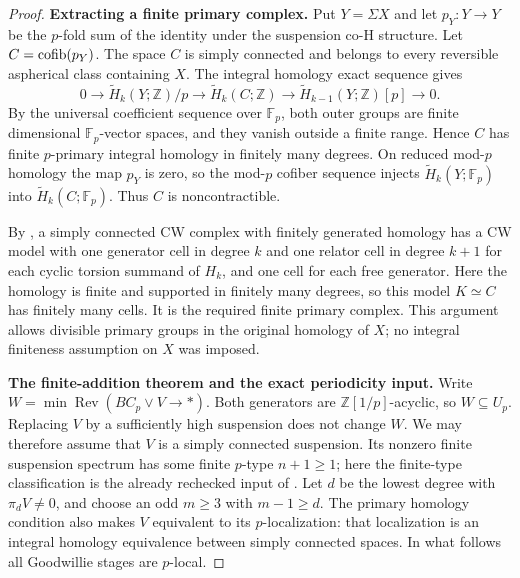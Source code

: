 \begin{proof}
\par\medskip\noindent\textbf{Extracting a finite primary complex.}\quad
Put $Y=\Sigma X$ and let $p_Y:Y\to Y$ be the $p$-fold sum
of the identity under the suspension co-H structure.  Let
$C=\operatorname{cofib}(p_Y)$.  The space $C$ is simply connected and belongs
to every reversible aspherical class containing $X$.  The integral
homology exact sequence gives
\[
 0\longrightarrow \widetilde H_k(Y;\mathbb Z)/p
 \longrightarrow \widetilde H_k(C;\mathbb Z)
 \longrightarrow \widetilde H_{k-1}(Y;\mathbb Z)[p]
 \longrightarrow0.
 \tag{A4.7.3}
\]
By the universal coefficient sequence over $\mathbb F_p$, both
outer groups are finite dimensional $\mathbb F_p$-vector spaces,
and they vanish outside a finite range.  Hence $C$ has finite
$p$-primary integral homology in finitely many degrees.  On
reduced mod-$p$ homology the map $p_Y$ is zero, so the mod-$p$
cofiber sequence injects $\widetilde H_k(Y;\mathbb F_p)$ into
$\widetilde H_k(C;\mathbb F_p)$.  Thus $C$ is noncontractible.

By \citet[Proposition~4C.1 and its proof, pp.~429--430]{A2Hatcher},
a simply connected CW complex with finitely generated homology
has a CW model with one generator cell in degree $k$ and one
relator cell in degree $k+1$ for each cyclic torsion summand of
$H_k$, and one cell for each free generator.  Here the homology
is finite and supported in finitely many degrees, so this model
$K\simeq C$ has finitely many cells.  It is the required finite
primary complex.  This argument allows divisible primary groups
in the original homology of $X$; no integral finiteness assumption
on $X$ was imposed.

\par\medskip\noindent\textbf{The finite-addition theorem and the exact periodicity input.}\quad
Write $W=\min\operatorname{Rev}(BC_p\vee V\to*)$.
Both generators are $\mathbb Z[1/p]$-acyclic, so $W\subseteq U_p$.
Replacing $V$ by a sufficiently high suspension does not change
$W$.  We may therefore assume that $V$ is a simply connected
suspension.  Its nonzero finite suspension spectrum has some
finite $p$-type $n+1\geq1$; here the finite-type classification
is the already rechecked input of \citet{AHopkinsSmith}.
Let $d$ be the lowest degree with $\pi_dV\ne0$, and choose an
odd $m\geq3$ with $m-1\geq d$.  The primary homology condition
also makes $V$ equivalent to its $p$-localization: that localization
is an integral homology equivalence between simply connected
spaces.  In what follows all Goodwillie stages are $p$-local.


\end{proof}
